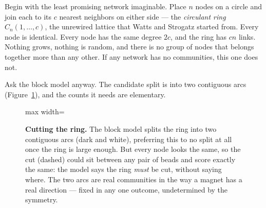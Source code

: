 Begin with the least promising network imaginable. Place $n$ nodes on a circle and
join each to its $c$ nearest neighbors on either side --- the \emph{circulant
ring} $C_n(1,\dots,c)$, the unrewired lattice that Watts and Strogatz started
from. Every node is identical. Every node has the same degree $2c$, and the ring
has $cn$ links. Nothing grows, nothing is random, and there is no group of nodes
that belongs together more than any other. If any network has no communities, this
one does not.

Ask the block model anyway. The candidate split is into two contiguous arcs
(Figure~\ref{fig:com-cutring}), and the counts it needs are elementary.

\begin{figure}[t]
\centering
\begin{adjustbox}{max width=\linewidth}\end{adjustbox}
\caption{\textbf{Cutting the ring.} The block model splits the ring into two
contiguous arcs (dark and white), preferring this to no split at all once the ring
is large enough. But every node looks the same, so the cut (dashed) could sit
between any pair of beads and score exactly the same: the model says the ring
\emph{must} be cut, without saying where. The two arcs are real communities in the
way a magnet has a real direction --- fixed in any one outcome, undetermined by the
symmetry.}
\label{fig:com-cutring}
\end{figure}

